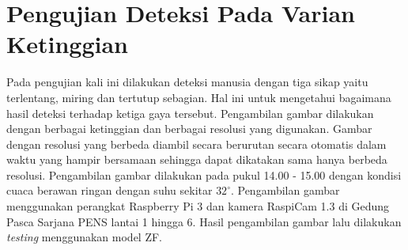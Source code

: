 \section{Pengujian Deteksi Pada Varian Ketinggian}

Pada pengujian kali ini dilakukan deteksi manusia dengan tiga sikap yaitu terlentang, miring dan tertutup sebagian. Hal ini untuk mengetahui bagaimana hasil deteksi terhadap ketiga gaya tersebut. Pengambilan gambar dilakukan dengan berbagai ketinggian dan berbagai resolusi yang digunakan. Gambar dengan resolusi yang berbeda diambil secara berurutan secara otomatis dalam waktu yang hampir bersamaan sehingga dapat dikatakan sama hanya berbeda resolusi. Pengambilan gambar dilakukan pada pukul 14.00 - 15.00 dengan kondisi cuaca berawan ringan dengan suhu sekitar $32^{\circ}$. Pengambilan gambar menggunakan perangkat Raspberry Pi 3 dan kamera RaspiCam 1.3 di Gedung Pasca Sarjana PENS lantai 1 hingga 6. Hasil pengambilan gambar lalu dilakukan \textit{testing} menggunakan model ZF.

